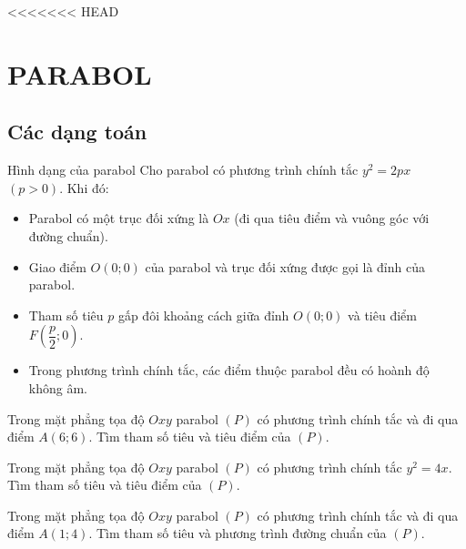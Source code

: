 <<<<<<< HEAD
\section{PARABOL}
\subsection{Các dạng toán}
\begin{dang}{Hình dạng của parabol}
	Cho parabol có phương trình chính tắc $y^2=2px$ $(p>0)$. Khi đó:
	\begin{itemize}
		\item Parabol có một trục đối xứng là $Ox$ (đi qua tiêu điểm và vuông góc với đường chuẩn).
		\item Giao điểm $O(0;0)$ của parabol và trục đối xứng được gọi là đỉnh của parabol.
		\item Tham số tiêu $p$ gấp đôi khoảng cách giữa đỉnh $O(0;0)$ và tiêu điểm $F\left(\dfrac{p}{2};0\right)$.
		\item Trong phương trình chính tắc, các điểm thuộc parabol đều có hoành độ không âm.
	\end{itemize}
\end{dang}
\begin{vd}
	Trong mặt phẳng tọa độ $Oxy$ parabol $(P)$ có phương trình chính tắc và đi qua điểm $A(6;6)$. Tìm tham số tiêu và tiêu điểm của $(P)$.
\end{vd}
\begin{vd}
	Trong mặt phẳng tọa độ $Oxy$ parabol $(P)$ có phương trình chính tắc $y^2=4x$. Tìm tham số tiêu và tiêu điểm của $(P)$.
\end{vd}
\begin{vd}
	Trong mặt phẳng tọa độ $Oxy$ parabol $(P)$ có phương trình chính tắc và đi qua điểm $A(1;4)$. Tìm tham số tiêu và phương trình đường chuẩn của $(P)$.
\end{vd}
